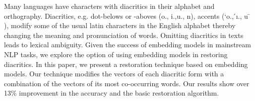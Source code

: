 Many languages have characters with diacritics in their alphabet and orthography. Diacritics, e.g. dot-belows or -aboves (o., i.,u., n), accents (`o.,  ́ı., u  ̄ ), modify some of the usual latin characters in the English alphabet thereby changing the meaning and pronunciation of words. Omitting diacritics in texts leads to lexical ambiguity. Given the success of embedding models in mainstream NLP tasks, we explore the option of using embedding models in restoring diacritics. In this paper, we present a restoration technique based on embedding models. Our technique modifies the vectors of each diacritic form with a combination of the vectors of its most co-occurring words. Our results show over 13\% improvement in the accuracy and the basic restoration algorithm.
